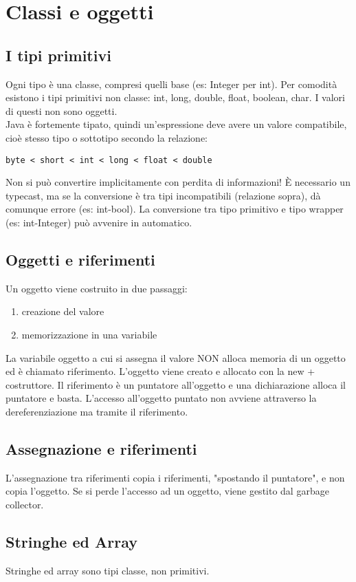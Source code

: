 \chapter{Classi e oggetti}

\section{I tipi primitivi}
Ogni tipo è una classe, compresi quelli base (es: Integer per int). 
Per comodità esistono i tipi primitivi non classe: int, long, double, float, boolean, char. I valori di questi non sono oggetti. \\
Java è fortemente tipato, quindi un'espressione deve avere un valore compatibile, cioè stesso tipo o sottotipo secondo la relazione:
\begin{verbatim}
byte < short < int < long < float < double 
\end{verbatim} 
Non si può convertire implicitamente con perdita di informazioni! È necessario un typecast, ma se la conversione è tra tipi incompatibili (relazione sopra), dà comunque errore (es: int-bool). La conversione tra tipo primitivo e tipo wrapper (es: int-Integer) può avvenire in automatico.

\section{Oggetti e riferimenti}
Un oggetto viene costruito in due passaggi:
\begin{enumerate}
\item creazione del valore
\item memorizzazione in una variabile
\end{enumerate}
La variabile oggetto a cui si assegna il valore NON alloca memoria di un oggetto ed è chiamato riferimento.
L'oggetto viene creato e allocato con la new + costruttore.
Il riferimento è un puntatore all'oggetto e una dichiarazione alloca il puntatore e basta. L'accesso all'oggetto puntato non avviene attraverso la dereferenziazione ma tramite il riferimento.

\section{Assegnazione e riferimenti}
L'assegnazione tra riferimenti copia i riferimenti, "spostando il puntatore", e non copia l'oggetto. Se si perde l'accesso ad un oggetto, viene gestito dal garbage collector.

\section{Stringhe ed Array}
Stringhe ed array sono tipi classe, non primitivi.

